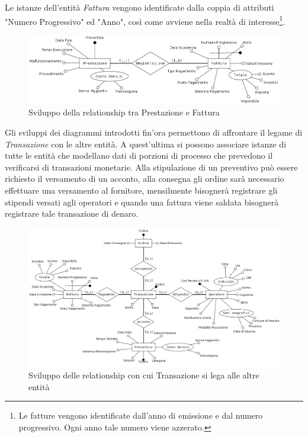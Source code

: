 			Le istanze dell'entità \emph{Fattura} vengono identificate dalla coppia di attributi "Numero Progressivo" ed "Anno", così come avviene nella realtà di interesse\footnote{Le fatture vengono identificate dall'anno di emissione e dal numero progressivo. Ogni anno tale numero viene azzerato.}.
			
			\begin{figure}
				\centering
				\includegraphics[width=11.5cm]{images/finitures/prestazione_fattura.png}
				\caption{Sviluppo della relationship tra Prestazione e Fattura}
				\label{fig:prestazione_fattura}
			\end{figure}
			
			Gli sviluppi dei diagrammi introdotti fin'ora permettono di affrontare il legame di \emph{Transazione} con le altre entità. A quest'ultima si possono associare istanze di tutte le entità che modellano dati di porzioni di processo che prevedono il verificarsi di transazioni monetarie. Alla stipulazione di un preventivo può essere richiesto il versamento di un acconto, alla consegna gli ordine sarà necessario effettuare una versamento al fornitore, mensilmente bisognerà registrare gli stipendi versati agli operatori e quando una fattura viene saldata bisognerà registrare tale transazione di denaro.
			
			\begin{figure}
				\centering
				\includegraphics[width=13cm]{images/finitures/transazione_fattura_preventivo_operatore_ordine.png}
				\caption{Sviluppo delle relationship con cui Transazione si lega alle altre entità}
				\label{fig:transazione_fattura_preventivo_operatore_ordine}
			\end{figure}
			
